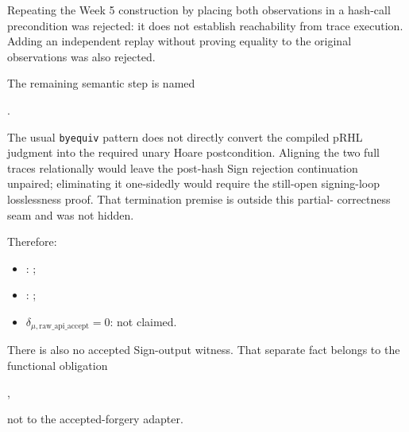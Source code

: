 Repeating the Week 5 construction by placing both observations in a hash-call
precondition was rejected: it does not establish reachability from trace
execution. Adding an independent replay without proving equality to the
original observations was also rejected.

The remaining semantic step is named
\begin{center}
\small{}.
\end{center}
The usual \texttt{byequiv} pattern does not directly convert the compiled
pRHL judgment into the required unary Hoare postcondition. Aligning the two
full traces relationally would leave the post-hash Sign rejection continuation
unpaired; eliminating it one-sidedly would require the still-open signing-loop
losslessness proof. That termination premise is outside this partial-
correctness seam and was not hidden.

Therefore:
\begin{itemize}
  \item {}: ;
  \item {}: ;
  \item \(\delta_{\mu,\mathrm{raw\_api\_accept}}=0\): not claimed.
\end{itemize}

There is also no accepted Sign-output witness. That separate fact belongs to
the functional obligation
\begin{center}
\small{},
\end{center}
not to the accepted-forgery adapter.
